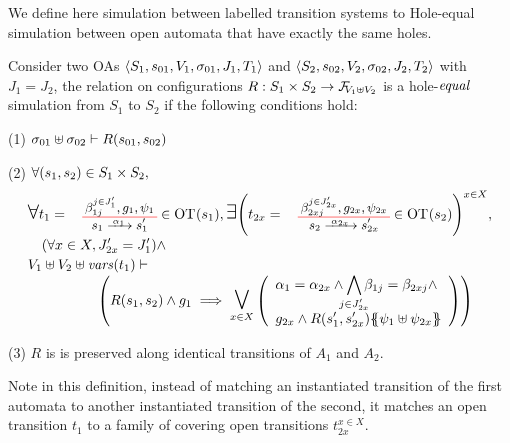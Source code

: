 \documentclass[runningheads]{llncs}
\newcommand{\symb}[1]{\makebox{\it #1}}
\begin{document}
\medskip


We define here simulation between labelled transition systems to Hole-equal simulation  between  open automata that have exactly the same holes.
\begin{definition}
Consider two OAs \(\OAg[1]\) and \(\OAg[2]\) with  \(J_1 = J_2\), the relation on configurations \(R: S_1 \times S_2 \to \rformulas[V_1 \uplus V_2]\) is a hole-\(\symb{equal}\) simulation from $S_1$ to $S_2$ if the following conditions hold: 
\item[(1)] \(\sigma_{01} \uplus \sigma_{02} \vdash R\mpar{s_{01}, s_{02}}\)
\item[(2)] \(\forall \mpar{s_1, s_2} \in S_1 \times S_2,\)\vspace{-8pt}
\noindent\begin{multline*}
\everymath{\displaystyle}\begin{array}{l}
		\bigsymb{\forall} t_1 = \OTx{1}{}{1}{1} \in \fOT{s_1}, \bigsymb{\exists} \mpar{t_{2x} = \OTx{2}{x}{2x}{2x} \in \fOT{s_2}}^{x \in X}, \\[10pt]
		\quad \mpar{\forall x \in X, J'_{2x}= J'_1} \nwedge\\[2pt]
		 V_1 \uplus V_2 \uplus \fvars{t_1} \vdash\\
\hspace{5em} \left( R\mpar{s_1, s_2} \wedge g_1 \implies \operatorname*{\bigsymb{\bigvee}}_{x \in X} \mpar{\begin{array}{l}
			\alpha_1 = \alpha_{2x} \wedge \bigwedge_\subbox{j \in J'_{2x}} \beta_{1j} = \beta_{2xj} \nwedge\\[12pt]
			 g_{2x} \wedge R\mpar{s'_1, s'_{2x}}\psubst{\psi_1 \uplus \psi_{2x}}
		\end{array}}\right)
	\end{array} 
\end{multline*}
\item[(3)] $R$ is  is preserved along identical transitions of \(A_1\) and \(A_2\).
\end{definition}


Note in this definition, instead of matching an instantiated transition of the first automata to another instantiated transition of the second, it matches an open transition $t_1$ to a family of covering open transitions $t_{2x}^{x\in X}$. %
\end{document}
